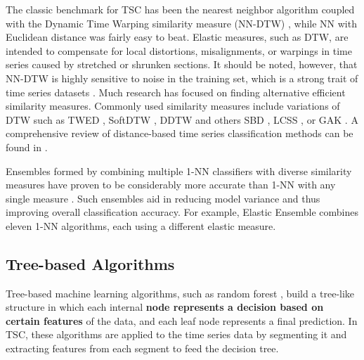 The classic benchmark for TSC has been the nearest neighbor algorithm coupled with the Dynamic Time Warping similarity measure (NN-DTW) \cite{bagnall2017great}, while NN with Euclidean distance was fairly easy to beat.  Elastic measures, such as DTW, are intended to compensate for local distortions, misalignments, or warpings in time series caused by stretched or shrunken sections. It should be noted, however, that NN-DTW is highly sensitive to noise in the training set, which is a strong trait of time series datasets \cite{abanda2019review}.
Much research has focused on finding alternative efficient similarity measures. Commonly used similarity measures include variations of DTW such as TWED \cite{marteau2008time}, SoftDTW \cite{cuturi2017soft}, DDTW \cite{keogh2001derivative} and others SBD \cite{paparrizos2017fast}, LCSS \cite{vlachos2002discovering}, or GAK \cite{cuturi2011fast}. A comprehensive review of distance-based time series classification methods can be found in \cite{abanda2019review}. 

Ensembles formed by combining multiple 1-NN classifiers with diverse similarity measures have proven to be considerably more accurate than 1-NN with any single measure \cite{bagnall2015time}. Such ensembles aid in reducing model variance and thus improving overall classification accuracy. 
For example, Elastic Ensemble \cite{bagnall2015time} combines eleven 1-NN algorithms, each using a different elastic measure.




\subsection{Tree-based Algorithms}


Tree-based machine learning algorithms, such as random forest \cite{breiman2001random}, build a tree-like structure in which each internal \textbf{node represents a decision based on certain features} of the data, and each leaf node represents a final prediction. In TSC, these algorithms are applied to the time series data by segmenting it and extracting features from each segment to feed the decision tree.

